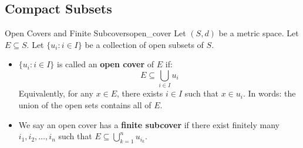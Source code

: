\subsection{Compact Subsets}
\begin{defn}{Open Covers and Finite Subcovers}{open_cover}
Let \((S, d)\) be a metric space. Let \(E \subseteq S\). Let \(\{u_i : i \in I\}\) be a collection of open subsets of \(S\).
\begin{itemize}
  \item \(\{u_i : i \in I\}\) is called an \textbf{open cover} of \(E\) if: 
  	\begin{equation*}
  		E \subseteq \bigcup_{i \in I}u_i
	\end{equation*}
	Equivalently, for any \(x \in E\), there exists \(i \in I\) such that \(x \in u_i\). In words: the union of the open sets contains all of \(E\).
  \item We say an open cover has a \textbf{finite subcover} if there exist finitely many \(i_1, i_2, \dots,i_n\) such that \(E \subseteq \bigcup_{k = 1}^n u_{i_k}\).
\end{itemize}

\end{defn}

